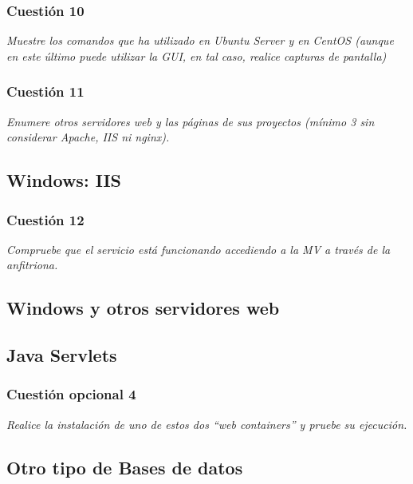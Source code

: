 \subsubsection{Cuestión 10}
\textit{Muestre los comandos que ha utilizado en Ubuntu Server y en CentOS (aunque en este último puede utilizar la GUI, en tal caso, realice capturas de pantalla)}

\subsubsection{Cuestión 11}
\textit{Enumere otros servidores web y las páginas de sus proyectos (mínimo 3 sin considerar Apache, IIS ni nginx).}


\subsection{Windows: IIS}
\subsubsection{Cuestión 12}
\textit{Compruebe que el servicio está funcionando accediendo a la MV a través de la anfitriona.}


\subsection{Windows y otros servidores web}

\subsection{Java Servlets}
\subsubsection{Cuestión opcional 4}
\textit{Realice la instalación de uno de estos dos “web containers” y pruebe su ejecución.}


\subsection{Otro tipo de Bases de datos}

